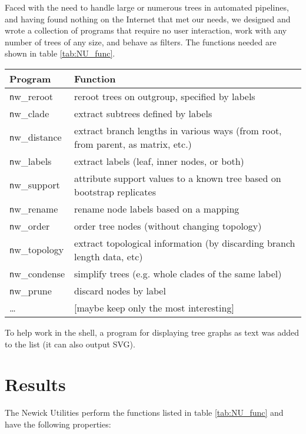 \documentclass[a4paper,11pt]{article}
\newcommand{\prog}[1][]{{\texttt nw\_#1}}
\begin{document}
Faced with the need to handle large or numerous trees in automated pipelines, and having found nothing on the Internet that met our needs, we designed and wrote
a collection of programs that require no user interaction, work with any number of trees of any size, and behave as filters. The functions needed are shown in table \ref{tab:NU_func}.

\begin{table*}
\begin{tabular}{lp{}}
Program & Function \\ 
\hline 
\prog{reroot} & reroot trees on outgroup, specified by labels \\
\prog{clade} & extract subtrees defined by labels \\
\prog{distance} & extract branch lengths in various ways (from root, from parent, as matrix, etc.) \\
\prog{labels} & extract labels (leaf, inner nodes, or both) \\
\prog{support} & attribute support values to a known tree based on bootstrap replicates \\
\prog{rename} & rename node labels based on a mapping \\
\prog{order} & order tree nodes (without changing topology) \\
\prog{topology} & extract topological information (by discarding branch length data, etc) \\
\prog{condense} & simplify trees (e.g. whole clades of the same label) \\
\prog{prune} & discard nodes by label \\
 \ldots & [maybe keep only the most interesting] \\
\hline
\end{tabular}
\caption{The Newick Utilities and their functions}
\label{tab:NU_func}
\end{table*}

To help work in the shell, a program for displaying tree graphs as text was added to the list (it can also output SVG).

\section*{Results}

The Newick Utilities perform the functions listed in table \ref{tab:NU_func} and have the following properties:
\end{document}
